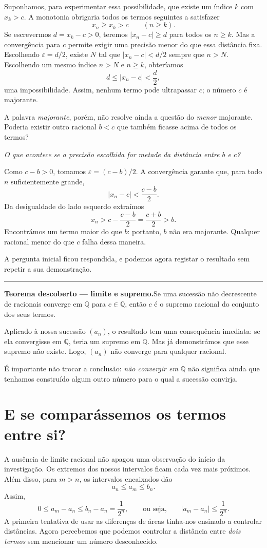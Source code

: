 \documentclass[11pt,a4paper]{article}
\newcommand{\Q}{\mathbb{Q}}
\newcommand{\questao}[1]{\par\medskip\noindent\textit{#1}\par\smallskip}
\newcommand{\assentado}[2]{%
\par\medskip\noindent\begingroup\color{azul}\rule{\linewidth}{0.45pt}\par\smallskip
\noindent\textbf{#1.}\enspace #2\par\endgroup\medskip}
\begin{document}
Suponhamos, para experimentar essa possibilidade, que existe um índice $k$ com $x_k>c$. A monotonia obrigaria todos os termos seguintes a satisfazer
\[
 x_n\ge x_k>c\qquad(n\ge k).
\]
Se escrevermos $d=x_k-c>0$, teremos $|x_n-c|\ge d$ para todos os $n\ge k$. Mas a convergência para $c$ permite exigir uma precisão menor do que essa distância fixa. Escolhendo $\varepsilon=d/2$, existe $N$ tal que $|x_n-c|<d/2$ sempre que $n>N$. Escolhendo um mesmo índice $n>N$ e $n\ge k$, obteríamos
\[
 d\le |x_n-c|<\frac d2,
\]
uma impossibilidade. Assim, nenhum termo pode ultrapassar $c$; o número $c$ é majorante.

A palavra \emph{majorante}, porém, não resolve ainda a questão do \emph{menor} majorante. Poderia existir outro racional $b<c$ que também ficasse acima de todos os termos?

\questao{O que acontece se a precisão escolhida for metade da distância entre $b$ e $c$?}

Como $c-b>0$, tomamos $\varepsilon=(c-b)/2$. A convergência garante que, para todo $n$ suficientemente grande,
\[
 |x_n-c|<\frac{c-b}{2}.
\]
Da desigualdade do lado esquerdo extraímos
\[
 x_n>c-\frac{c-b}{2}=\frac{c+b}{2}>b.
\]
Encontrámos um termo maior do que $b$: portanto, $b$ não era majorante. Qualquer racional menor do que $c$ falha dessa maneira.

A pergunta inicial ficou respondida, e podemos agora registar o resultado sem repetir a sua demonstração.

\assentado{Teorema descoberto --- limite e supremo}{Se uma sucessão não decrescente de racionais converge em $\Q$ para $c\in\Q$, então $c$ é o supremo racional do conjunto dos seus termos.}

Aplicado à nossa sucessão $(a_n)$, o resultado tem uma consequência imediata: se ela convergisse em $\Q$, teria um supremo em $\Q$. Mas já demonstrámos que esse supremo não existe. Logo, $(a_n)$ não converge para qualquer racional.

É importante não trocar a conclusão: \emph{não convergir em $\Q$} não significa ainda que tenhamos construído algum outro número para o qual a sucessão convirja.

\section{E se comparássemos os termos entre si?}

A ausência de limite racional não apagou uma observação do início da investigação. Os extremos dos nossos intervalos ficam cada vez mais próximos. Além disso, para $m>n$, os intervalos encaixados dão
\[
 a_n\le a_m\le b_n.
\]
Assim,
\[
 0\le a_m-a_n\le b_n-a_n=\frac1{2^n},
 \qquad\text{ou seja,}\qquad
 \boxed{|a_m-a_n|\le\frac1{2^n}}.
\]
A primeira tentativa de usar as diferenças de áreas tinha-nos ensinado a controlar distâncias. Agora percebemos que podemos controlar a distância entre \emph{dois termos} sem mencionar um número desconhecido.
\end{document}
